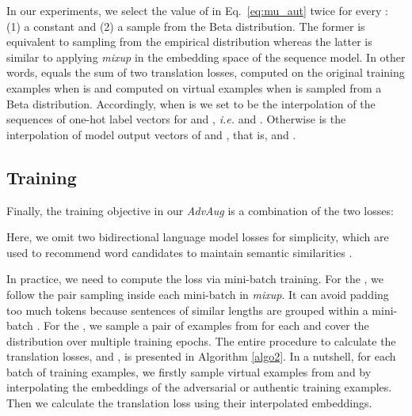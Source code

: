 \documentclass[11pt,a4paper]{article}
\newcommand{\ie}{\emph{i.e. }} \newcommand{\Ie}{\emph{I.e}}
\newcommand{\fancyname}{AdvAug}
\newcommand{\mixup}{\textit{mixup}\xspace}
\begin{document}
In our experiments, we select the value of  in Eq.~\eqref{eq:mu_aut} twice for every : (1) a constant  and (2) a sample from the Beta distribution.
The former is equivalent to sampling from the empirical distribution  whereas the latter is similar to applying \mixup in the embedding space of the sequence model. In other words,  equals the sum of two translation losses,  computed on the original training examples when  is  and  computed on virtual examples when  is sampled from a Beta distribution. Accordingly, when   is  we set  to be the interpolation of the sequences of one-hot label vectors for  and , \ie  and .
Otherwise  is the interpolation of model output vectors of  and , that is,  and .
\begin{algorithm}[!t]
\small
\SetAlgoLined
\LinesNumbered
{}
\SetKwFunction{algo}{\fancyname}
 \caption{Proposed {\em \fancyname} function.} \label{algo2}
\end{algorithm}
\subsection{Training}
Finally, the training objective in our {\em \fancyname} is a combination of the two losses:

Here, we omit two bidirectional language model losses for simplicity, which are used to recommend word candidates to maintain semantic similarities \cite{Cheng:19}.

In practice, we need to compute the loss via mini-batch training. For the , we follow the pair sampling inside each mini-batch in \mixup. It can avoid padding too much tokens because sentences of similar lengths are grouped within a mini-batch \cite{Vaswani:17}. For the , we sample a pair of examples from  for each  and cover the distribution over multiple training epochs. The entire procedure to calculate the translation losses,  and , is presented in Algorithm \ref{algo2}. 
In a nutshell, for each batch of training examples, we firstly sample virtual examples from  and  by interpolating the embeddings of the adversarial or authentic training examples. Then we calculate the translation loss using their interpolated embeddings. 
\end{document}
